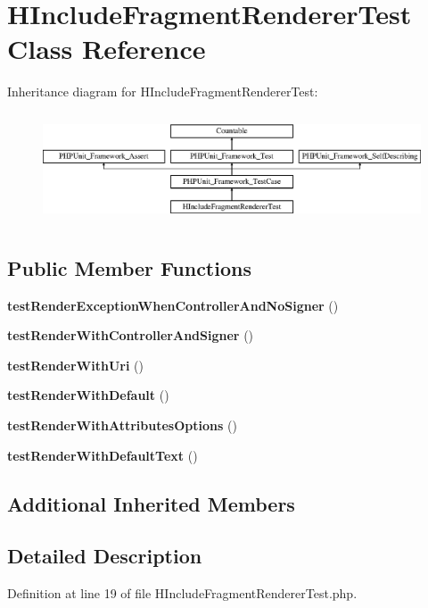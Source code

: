 \section{H\+Include\+Fragment\+Renderer\+Test Class Reference}
\label{class_symfony_1_1_component_1_1_http_kernel_1_1_tests_1_1_fragment_1_1_h_include_fragment_renderer_test}
Inheritance diagram for H\+Include\+Fragment\+Renderer\+Test\+:\begin{figure}[H]
\begin{center}
\leavevmode
\includegraphics[height=3.303835cm]{class_symfony_1_1_component_1_1_http_kernel_1_1_tests_1_1_fragment_1_1_h_include_fragment_renderer_test}
\end{center}
\end{figure}
\subsection*{Public Member Functions}
\begin{DoxyCompactItemize}
\item 
{\bf test\+Render\+Exception\+When\+Controller\+And\+No\+Signer} ()
\item 
{\bf test\+Render\+With\+Controller\+And\+Signer} ()
\item 
{\bf test\+Render\+With\+Uri} ()
\item 
{\bf test\+Render\+With\+Default} ()
\item 
{\bf test\+Render\+With\+Attributes\+Options} ()
\item 
{\bf test\+Render\+With\+Default\+Text} ()
\end{DoxyCompactItemize}
\subsection*{Additional Inherited Members}


\subsection{Detailed Description}


Definition at line 19 of file H\+Include\+Fragment\+Renderer\+Test.\+php.



